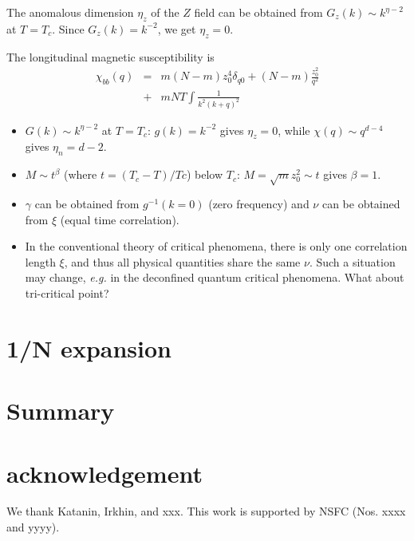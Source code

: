 \documentclass[aps,twocolumn,superscriptaddress]{revtex4-1}
\newcommand{\bea}{\begin{eqnarray}}
\newcommand{\eea}{\end{eqnarray}}
\begin{document}
The anomalous dimension $\eta_z$ of the $Z$ field can be obtained from $G_z(k)\sim k^{\eta-2}$ at $T=T_c$. Since $G_z(k)=k^{-2}$, we get $\eta_z=0$. 


The longitudinal magnetic susceptibility is
\bea \chi_{bb}(q) &=& m(N-m) z_0^4\delta_{q0} + (N-m)\frac{z_0^2}{q^2} \nonumber\\ 
&+& mNT\int \frac{1}{k^2(k+q)^2} \eea




\begin{itemize}
	\item $G(k)\sim k^{\eta-2}$ at $T=T_c$: $g(k)=k^{-2}$ gives $\eta_z=0$, while $\chi(q)\sim q^{d-4}$ gives $\eta_n=d-2$.
	\item $M\sim t^\beta$ (where $t=(T_c-T)/Tc$) below $T_c$: $M=\sqrt{m}z_0^2\sim t$ gives $\beta=1$.
	\item $\gamma$ can be obtained from $g^{-1}(k=0)$ (zero frequency) and $\nu$ can be obtained from $\xi$ (equal time correlation).
	\item In the conventional theory of critical phenomena, there is only one correlation length $\xi$, and thus all physical quantities share the same $\nu$. Such a situation may change, \textit{e.g.} in the deconfined quantum critical phenomena. What about tri-critical point?
\end{itemize}

\section{1/N expansion}

\section{Summary}

\section{acknowledgement}
We thank Katanin, Irkhin, and xxx. This work is supported by NSFC (Nos. xxxx and yyyy).



\end{document}
